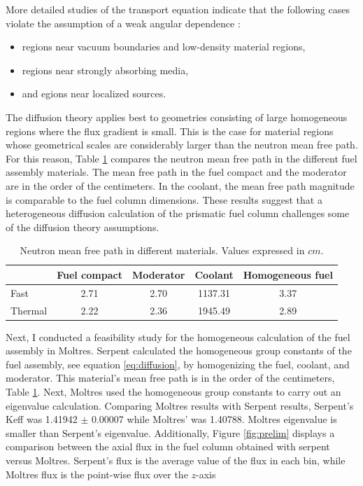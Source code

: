 More detailed studies of the transport equation indicate that the following cases violate the assumption of a weak angular dependence \cite{duderstadt_nuclear_1976}:
\begin{itemize}
    \item regions near vacuum boundaries and low-density material regions,
    \item regions near strongly absorbing media,
    \item and egions near localized sources.
\end{itemize}

The diffusion theory applies best to geometries consisting of large homogeneous regions where the flux gradient is small.
This is the case for material regions whose geometrical scales are considerably larger than the neutron mean free path.
For this reason, Table \ref{tab:mfp} compares the neutron mean free path in the different fuel assembly materials.
The mean free path in the fuel compact and the moderator are in the order of the centimeters.
In the coolant, the mean free path magnitude is comparable to the fuel column dimensions.
These results suggest that a heterogeneous diffusion calculation of the prismatic fuel column challenges some of the diffusion theory assumptions.

\begin{table}[htbp!]
  \centering
  \caption{Neutron mean free path in different materials. Values expressed in $cm$.}
  \begin{tabular}{l|cccc}
  \toprule
              & Fuel compact  & Moderator  & Coolant  & Homogeneous fuel \\
  \midrule
  Fast  		  & 2.71 & 2.70 & 1137.31 & 3.37 \\
  Thermal		  & 2.22 & 2.36 & 1945.49 & 2.89 \\
  \bottomrule
  \end{tabular}
  \label{tab:mfp}
\end{table}

Next, I conducted a feasibility study for the homogeneous calculation of the fuel assembly in Moltres.
Serpent calculated the homogeneous group constants of the fuel assembly, see equation \ref{eq:diffusion}, by homogenizing the fuel, coolant, and moderator.
This material's mean free path is in the order of the centimeters, Table \ref{tab:mfp}.
Next, Moltres used the homogeneous group constants to carry out an eigenvalue calculation.
Comparing Moltres results with Serpent results, Serpent's \gls{Keff} was 1.41942 $\pm$ 0.00007 while Moltres' was 1.40788.
Moltres eigenvalue is smaller than Serpent's eigenvalue.
Additionally, Figure \ref{fig:prelim} displays a comparison between the axial flux in the fuel column obtained with serpent versus Moltres.
Serpent's flux is the average value of the flux in each bin, while Moltres flux is the point-wise flux over the $z$-axis

